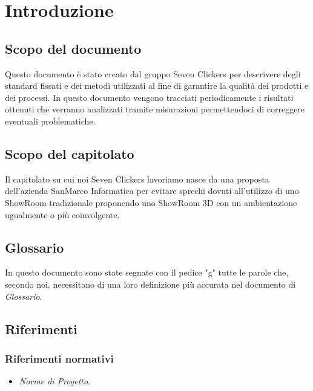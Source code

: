 \section{Introduzione}
\subsection{Scopo del documento}
Questo documento è stato creato dal gruppo Seven Clickers per descrivere degli standard fissati e dei metodi utilizzati al fine di garantire la qualità dei prodotti e dei processi.
In questo documento vengono tracciati periodicamente i risultati ottenuti che verranno analizzati tramite misurazioni permettendoci di correggere eventuali problematiche.

\subsection{Scopo del capitolato}
Il capitolato su cui noi Seven Clickers lavoriamo nasce da una proposta dell'azienda SanMarco Informatica per evitare sprechi dovuti all'utilizzo di uno ShowRoom tradizionale proponendo uno ShowRoom 3D con un ambientazione ugualmente o più coinvolgente.

\subsection{Glossario}
In questo documento sono state segnate con il pedice "g" tutte le parole che, secondo noi, necessitano di una loro definizione più accurata nel documento di \textit{Glossario}.

\subsection{Riferimenti}
\subsubsection{Riferimenti normativi}
\begin{itemize}
\item \textit{Norme di Progetto}.
\end{itemize}


